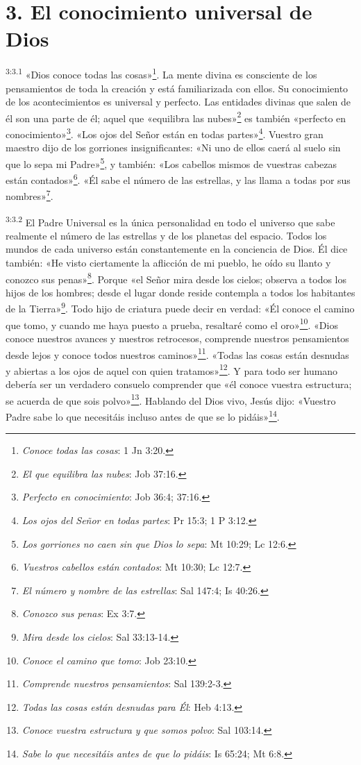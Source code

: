 \section*{3. El conocimiento universal de Dios}
\par
\textsuperscript{3:3.1} «Dios conoce todas las cosas»\footnote{\textit{Conoce todas las cosas}: 1 Jn 3:20.}. La mente divina es consciente de los pensamientos de toda la creación y está familiarizada con ellos. Su conocimiento de los acontecimientos es universal y perfecto. Las entidades divinas que salen de él son una parte de él; aquel que «equilibra las nubes»\footnote{\textit{El que equilibra las nubes}: Job 37:16.} es también «perfecto en conocimiento»\footnote{\textit{Perfecto en conocimiento}: Job 36:4; 37:16.}. «Los ojos del Señor están en todas partes»\footnote{\textit{Los ojos del Señor en todas partes}: Pr 15:3; 1 P 3:12.}. Vuestro gran maestro dijo de los gorriones insignificantes: «Ni uno de ellos caerá al suelo sin que lo sepa mi Padre»\footnote{\textit{Los gorriones no caen sin que Dios lo sepa}: Mt 10:29; Lc 12:6.}, y también: «Los cabellos mismos de vuestras cabezas están contados»\footnote{\textit{Vuestros cabellos están contados}: Mt 10:30; Lc 12:7.}. «Él sabe el número de las estrellas, y las llama a todas por sus nombres»\footnote{\textit{El número y nombre de las estrellas}: Sal 147:4; Is 40:26.}.

\par
\textsuperscript{3:3.2} El Padre Universal es la única personalidad en todo el universo que sabe realmente el número de las estrellas y de los planetas del espacio. Todos los mundos de cada universo están constantemente en la conciencia de Dios. Él dice también: «He visto ciertamente la aflicción de mi pueblo, he oído su llanto y conozco sus penas»\footnote{\textit{Conozco sus penas}: Ex 3:7.}. Porque «el Señor mira desde los cielos; observa a todos los hijos de los hombres; desde el lugar donde reside contempla a todos los habitantes de la Tierra»\footnote{\textit{Mira desde los cielos}: Sal 33:13-14.}. Todo hijo de criatura puede decir en verdad: «Él conoce el camino que tomo, y cuando me haya puesto a prueba, resaltaré como el oro»\footnote{\textit{Conoce el camino que tomo}: Job 23:10.}. «Dios conoce nuestros avances y nuestros retrocesos, comprende nuestros pensamientos desde lejos y conoce todos nuestros caminos»\footnote{\textit{Comprende nuestros pensamientos}: Sal 139:2-3.}. «Todas las cosas están desnudas y abiertas a los ojos de aquel con quien tratamos»\footnote{\textit{Todas las cosas están desnudas para Él}: Heb 4:13.}. Y para todo ser humano debería ser un verdadero consuelo comprender que «él conoce vuestra estructura; se acuerda de que sois polvo»\footnote{\textit{Conoce vuestra estructura y que somos polvo}: Sal 103:14.}. Hablando del Dios vivo, Jesús dijo: «Vuestro Padre sabe lo que necesitáis incluso antes de que se lo pidáis»\footnote{\textit{Sabe lo que necesitáis antes de que lo pidáis}: Is 65:24; Mt 6:8.}.

